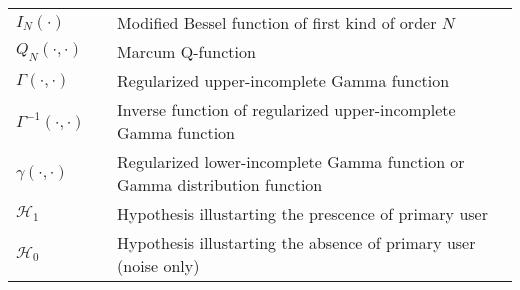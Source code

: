 \begin{longtable}{p{}p{}p{}}
       $I_{N}(\cdot)$	        & &	Modified Bessel function of first kind of order $N$ \\		
       $Q_{N}(\cdot, \cdot)$	& &	Marcum Q-function \\		
       $\Gamma(\cdot, \cdot)$	& &	Regularized upper-incomplete Gamma function\\		
       $\Gamma^{-1}(\cdot, \cdot)$	& &	Inverse function of regularized upper-incomplete Gamma function\\		
       $\gamma(\cdot, \cdot)$	& &	Regularized lower-incomplete Gamma function or Gamma distribution function\\		
       $\mathcal H_1$			& &	Hypothesis illustarting the prescence of primary user\\	
       $\mathcal H_0$			& &	Hypothesis illustarting the absence of primary user (noise only) \\		
\end{longtable}
  




